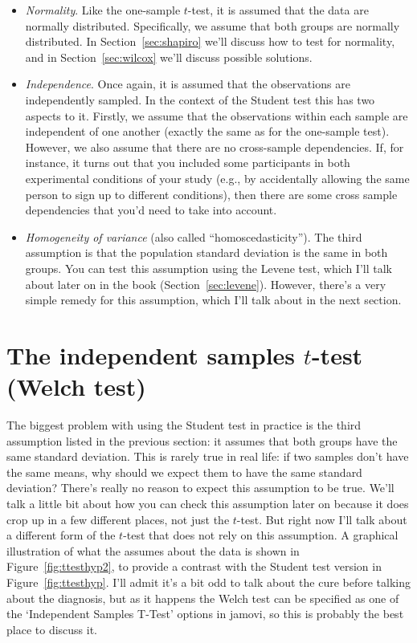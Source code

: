 \begin{itemize}
\item {\it Normality}. Like the one-sample $t$-test, it is assumed that the data are normally distributed. Specifically, we assume that both groups are normally distributed. In Section~\ref{sec:shapiro} we'll discuss how to test for normality, and in Section~\ref{sec:wilcox} we'll discuss possible solutions.
\item {\it Independence}. Once again, it is assumed that the observations are independently sampled. In the context of the Student test this has two aspects to it. Firstly, we assume that the observations within each sample are independent of one another (exactly the same as for the one-sample test). However, we also assume that there are no cross-sample dependencies. If, for instance, it turns out that you included some participants in both experimental conditions of your study (e.g., by accidentally allowing the same person to sign up to different conditions), then there are some cross sample dependencies that you'd need to take into account.
\item {\it Homogeneity of variance} (also called ``homoscedasticity''). The third assumption is that the population standard deviation is the same in both groups. You can test this assumption using the Levene test, which I'll talk about later on in the book (Section~\ref{sec:levene}). However, there's a very simple remedy for this assumption, which I'll talk about in the next section.
\end{itemize}


\section{The independent samples $t$-test (Welch test)~\label{sec:welchttest}}

The biggest problem with using the Student test in practice is the third assumption listed in the previous section: it assumes that both groups have the same standard deviation. This is rarely true in real life: if two samples don't have the same means, why should we expect them to have the same standard deviation? There's really no reason to expect this assumption to be true. We'll talk a little bit about how you can check this assumption later on because it does crop up in a few different places, not just the $t$-test. But right now I'll talk about a different form of the $t$-test \cite{Welch1947} that does not rely on this assumption. A graphical illustration of what the  assumes about the data is shown in Figure~\ref{fig:ttesthyp2}, to provide a contrast with the Student test version in Figure~\ref{fig:ttesthyp}. I'll admit it's a bit odd to talk about the cure before talking about the diagnosis, but as it happens the Welch test can be specified as one of the `Independent Samples T-Test' options in jamovi, so this is probably the best place to discuss it. 

